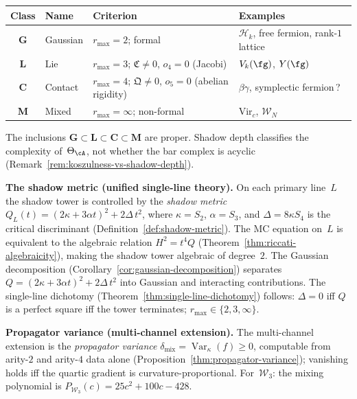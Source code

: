 \begin{center}
\renewcommand{\arraystretch}{1.15}
\begin{tabular}{@{}clll@{}}
\toprule
\textbf{Class} & \textbf{Name} & \textbf{Criterion}
  & \textbf{Examples} \\
\midrule
\textbf{G} & Gaussian
  & $r_{\max}=2$; formal
  & $\mathcal{H}_k$, free fermion, rank-$1$ lattice \\
\textbf{L} & Lie
  & $r_{\max}=3$; $\mathfrak{C}\neq 0$, $o_4=0$ (Jacobi)
  & $V_k(\fg)$, $Y(\fg)$ \\
\textbf{C} & Contact
  & $r_{\max}=4$; $\mathfrak{Q}\neq 0$, $o_5=0$ (abelian rigidity)
  & $\beta\gamma$, symplectic fermion\,? \\
\textbf{M} & Mixed
  & $r_{\max}=\infty$; non-formal
  & $\mathrm{Vir}_c$, $\mathcal{W}_N$ \\
\bottomrule
\end{tabular}
\end{center}

\noindent
The inclusions $\mathbf{G} \subset \mathbf{L} \subset
\mathbf{C} \subset \mathbf{M}$ are proper.  Shadow depth
classifies the complexity of~$\Theta_\cA$, not whether the
bar complex is acyclic
(Remark~\ref{rem:koszulness-vs-shadow-depth}).

\smallskip\noindent\textbf{The shadow metric (unified single-line theory).}
On each primary line~$L$ the shadow tower is controlled by the \emph{shadow metric} $Q_L(t) = (2\kappa + 3\alpha t)^2 + 2\Delta\, t^2$, where $\kappa = S_2$, $\alpha = S_3$, and $\Delta = 8\kappa S_4$ is the critical discriminant (Definition~\ref{def:shadow-metric}).
The MC equation on~$L$ is equivalent to the algebraic relation $H^2 = t^4 Q$ (Theorem~\ref{thm:riccati-algebraicity}), making the shadow tower algebraic of degree~$2$.
The Gaussian decomposition (Corollary~\ref{cor:gaussian-decomposition}) separates $Q = (2\kappa{+}3\alpha t)^2 + 2\Delta\,t^2$ into Gaussian and interacting contributions.
The single-line dichotomy (Theorem~\ref{thm:single-line-dichotomy}) follows: $\Delta = 0$ iff $Q$ is a perfect square iff the tower terminates; $r_{\max} \in \{2,3,\infty\}$.

\smallskip\noindent\textbf{Propagator variance (multi-channel extension).}
The multi-channel extension is the \emph{propagator variance}
$\delta_{\mathrm{mix}} = \operatorname{Var}_\kappa(f) \ge 0$,
computable from arity-$2$ and arity-$4$ data alone
(Proposition~\ref{thm:propagator-variance});
vanishing holds iff the quartic gradient is curvature-proportional.
For~$\mathcal{W}_3$: the mixing polynomial is $P_{\mathcal{W}_3}(c) = 25c^2 + 100c - 428$.


